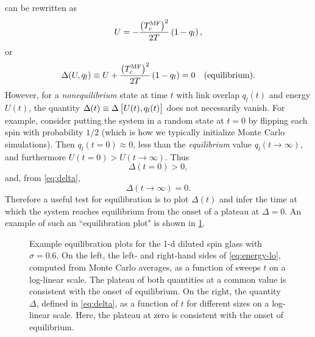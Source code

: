  can be rewritten as
\begin{equation}
  U = - \frac{\left(T_c^{\mathrm{MF}}\right)^2}{2T} \left(1 - q_l\right),
  \label{eq:energy-lo}
\end{equation}
or
\begin{equation}
  \Delta(U,q_l) \equiv
  U + \frac{\left(T_c^{\mathrm{MF}}\right)^2}{2T} \left(1 - q_l\right) = 0
  \quad\text{(equilibrium).}
  \label{eq:delta}
\end{equation}
However, for a \emph{nonequilibrium} state at time $t$ with link overlap
$q_l(t)$ and energy $U(t)$, the quantity $\Delta(t) \equiv
\Delta\left[U(t),q_l(t)\right]$ does not necessarily vanish. For example, consider
putting the system in a random state at $t=0$ by flipping each spin with
probability $1/2$ (which is how we typically initialize Monte Carlo
simulations). Then $q_l(t=0) \approx 0$, less than the \emph{equilibrium} value
$q_l(t \to \infty)$, and furthermore $U(t=0) > U(t \to \infty)$. Thus
\begin{equation}
  \Delta(t=0) > 0,
\end{equation}
and, from \cref{eq:delta},
\begin{equation}
  \Delta(t \to \infty) = 0.
\end{equation}
Therefore a useful test for equilibration is to plot $\Delta(t)$ and infer the
time at which the system reaches equilibrium from the onset of a plateau at
$\Delta=0$. An example of such an ``equilibration plot" is shown in
\cref{fig:equil}.


\begin{figure}
  \centering
  
  
  \caption[%
    Example equilibration plots for a spin glass model with Gaussian couplings.
  ]
  {%
    Example equilibration plots for the 1-d diluted spin glass with
    $\sigma=0.6$. On the left, the left- and right-hand sides of
    \cref{eq:energy-lo}, computed from Monte Carlo averages, as a function of
    sweeps $t$ on a log-linear scale. The plateau of both quantities at a
    common value is consistent with the onset of equilibrium. On the right, the
    quantity $\Delta$, defined in \cref{eq:delta}, as a function of $t$ for
    different sizes on a log-linear scale. Here, the plateau at zero is
    consistent with the onset of equilibrium.
  }
  \label{fig:equil}
\end{figure}

